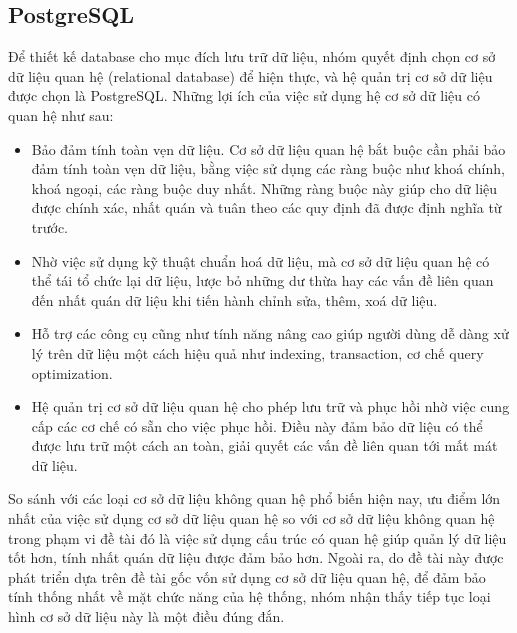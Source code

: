 \subsection{PostgreSQL}
Để thiết kế database cho mục đích lưu trữ dữ liệu, nhóm quyết định chọn cơ sở
dữ liệu quan hệ (relational database) để hiện thực, và hệ quản trị cơ sở dữ liệu
được chọn là PostgreSQL. Những lợi ích của việc sử dụng hệ cơ sở dữ liệu có quan
hệ như sau:
\begin{itemize}
    \item Bảo đảm tính toàn vẹn dữ liệu. Cơ sở dữ liệu quan hệ bắt buộc cần phải bảo đảm
          tính toàn vẹn dữ liệu, bằng việc sử dụng các ràng buộc như khoá chính, khoá
          ngoại, các ràng buộc duy nhất. Những ràng buộc này giúp cho dữ liệu được chính
          xác, nhất quán và tuân theo các quy định đã được định nghĩa từ trước.
    \item Nhờ việc sử dụng kỹ thuật chuẩn hoá dữ liệu, mà cơ sở dữ liệu quan hệ có thể
          tái tổ chức lại dữ liệu, lược bỏ những dư thừa hay các vấn đề liên quan đến
          nhất quán dữ liệu khi tiến hành chỉnh sửa, thêm, xoá dữ liệu.
    \item Hỗ trợ các công cụ cũng như tính năng nâng cao giúp người dùng dễ dàng xử lý
          trên dữ liệu một cách hiệu quả như indexing, transaction, cơ chế query
          optimization.
    \item Hệ quản trị cơ sở dữ liệu quan hệ cho phép lưu trữ và phục hồi nhờ việc cung
          cấp các cơ chế có sẵn cho việc phục hồi. Điều này đảm bảo dữ liệu có thể được
          lưu trữ một cách an toàn, giải quyết các vấn đề liên quan tới mất mát dữ liệu.
\end{itemize}
So sánh với các loại cơ sở dữ liệu không quan hệ phổ biến hiện nay, ưu điểm lớn nhất của việc sử dụng cơ sở dữ liệu quan hệ so với cơ sở dữ liệu không quan hệ trong phạm vi đề tài đó là việc sử dụng cấu trúc có quan hệ giúp quản lý dữ liệu tốt hơn, tính nhất quán dữ liệu được đảm bảo hơn. Ngoài ra, do đề tài này được phát triển dựa trên đề tài gốc vốn sử dụng cơ sở dữ liệu quan hệ, để đảm bảo tính thống nhất về mặt chức năng của hệ thống, nhóm nhận thấy tiếp tục loại hình cơ sở dữ liệu này là một điều đúng đắn.